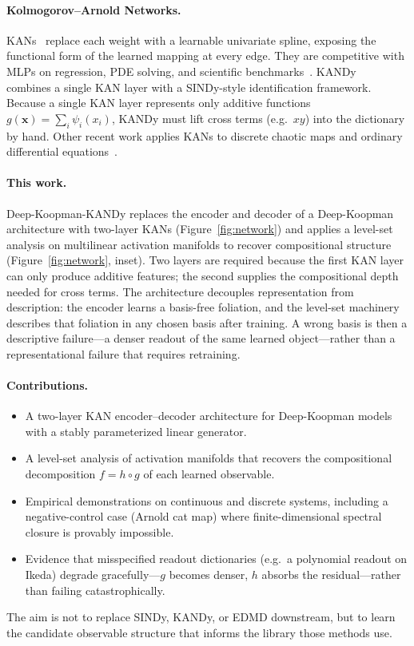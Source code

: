 \documentclass{article}
\begin{document}
\paragraph{Kolmogorov--Arnold Networks.}
KANs~\cite{liu2025kan} replace each weight with a learnable univariate spline, exposing the functional form of the learned mapping at every edge. They are competitive with MLPs on regression, PDE solving, and scientific benchmarks~\cite{liu2025kan, coxkan2025, naturegraphkan2025}. KANDy~\cite{kandy} combines a single KAN layer with a SINDy-style identification framework. Because a single KAN layer represents only additive functions $g(\mathbf{x}) = \sum_i \psi_i(x_i)$, KANDy must lift cross terms (e.g.\ $xy$) into the dictionary by hand. Other recent work applies KANs to discrete chaotic maps and ordinary differential equations~\cite{Panahi2025KANModelDiscovery, Bagrow2025, Koenig2024,
Koenig2025}.

\paragraph{This work.}
Deep-Koopman-KANDy replaces the encoder and decoder of a Deep-Koopman architecture with two-layer KANs (Figure~\ref{fig:network}) and applies a level-set analysis on multilinear activation manifolds to recover compositional structure (Figure~\ref{fig:network}, inset). Two layers are required because the first KAN layer can only produce additive features; the second supplies the compositional depth needed for cross terms. The architecture decouples representation from description: the encoder learns a basis-free foliation, and the level-set machinery describes that foliation in any chosen basis after training. A wrong basis is then a descriptive failure---a denser readout of the same learned object---rather than a representational failure that requires retraining.

\paragraph{Contributions.}
\begin{itemize}[leftmargin=1.2em, itemsep=0pt, topsep=2pt]
\item A two-layer KAN encoder--decoder architecture for Deep-Koopman models with
a stably parameterized linear generator.
\item A level-set analysis of activation manifolds that recovers the
compositional decomposition $f = h \circ g$ of each learned observable.
\item Empirical demonstrations on continuous and discrete systems, including a negative-control case (Arnold cat map) where finite-dimensional spectral closure is provably impossible.
\item Evidence that misspecified readout dictionaries (e.g.\ a polynomial readout on Ikeda) degrade gracefully---$g$ becomes denser, $h$ absorbs the residual---rather than failing catastrophically.
\end{itemize}
The aim is not to replace SINDy, KANDy, or EDMD downstream, but to learn the
candidate observable structure that informs the library those methods use.
\end{document}
